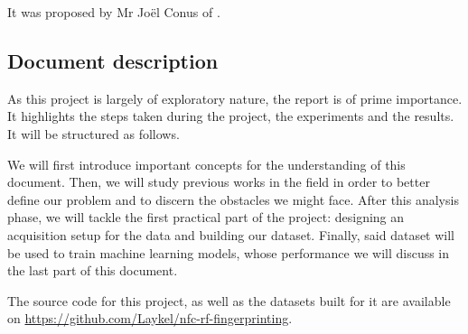 It was proposed by Mr Joël Conus of \TBindustryName.

\subsection{Document description}

As this project is largely of exploratory nature, the report is of prime importance. It highlights the steps taken during the project, the experiments and the results. It will be structured as follows.

We will first introduce important concepts for the understanding of this document. Then, we will study previous works in the field in order to better define our problem and to discern the obstacles we might face. After this analysis phase, we will tackle the first practical part of the project: designing an acquisition setup for the data and building our dataset. Finally, said dataset will be used to train machine learning models, whose performance we will discuss in the last part of this document.

The source code for this project, as well as the datasets built for it are available on \url{https://github.com/Laykel/nfc-rf-fingerprinting}.
